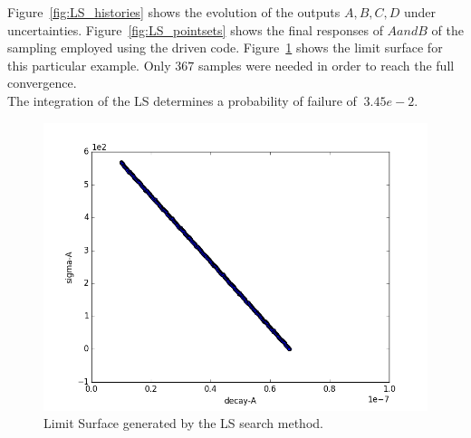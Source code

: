  Figure~\ref{fig:LS_histories}
 shows the evolution of the outputs $A,B,C,D$ under uncertainties.
 Figure~\ref{fig:LS_pointsets} shows the final responses  of $A and B$
 of the sampling employed using the driven code.
 Figure~\ref{fig:LSplot}  shows the limit surface for this particular
 example. Only $367$ samples were needed in order to reach the full
 convergence.
 \\The integration of the LS determines a probability of failure of
 $~3.45e-2$.
 \begin{figure}[h!]
  \centering
  \includegraphics[scale=0.7]{../../tests/framework/user_guide/AdaptiveSamplingStrategies/gold/LSsearch/1-limitSurfacePlot_scatter.png}
  \caption{Limit Surface generated by the LS search method.}
  \label{fig:LSplot}
 \end{figure}








